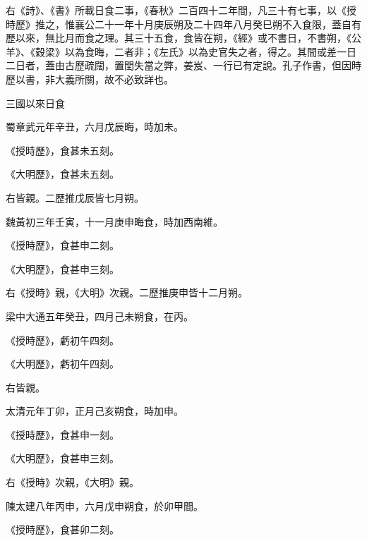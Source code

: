 \begin{pinyinscope}
 右《詩》、《書》所載日食二事，《春秋》二百四十二年間，凡三十有七事，以《授時歷》推之，惟襄公二十一年十月庚辰朔及二十四年八月癸巳朔不入食限，蓋自有歷以來，無比月而食之理。其三十五食，食皆在朔，《經》或不書日，不書朔，《公羊》、《穀梁》以為食晦，二者非；《左氏》以為史官失之者，得之。其間或差一日二日者，蓋由古歷疏闊，置閏失當之弊，姜岌、一行已有定說。孔子作書，但因時歷以書，非大義所關，故不必致詳也。



 三國以來日食



 蜀章武元年辛丑，六月戊辰晦，時加未。



 《授時歷》，食甚未五刻。



 《大明歷》，食甚未五刻。



 右皆親。二歷推戊辰皆七月朔。



 魏黃初三年壬寅，十一月庚申晦食，時加西南維。



 《授時歷》，食甚申二刻。



 《大明歷》，食甚申三刻。



 右《授時》親，《大明》次親。二歷推庚申皆十二月朔。



 梁中大通五年癸丑，四月己未朔食，在丙。



 《授時歷》，虧初午四刻。



 《大明歷》，虧初午四刻。



 右皆親。



 太清元年丁卯，正月己亥朔食，時加申。



 《授時歷》，食甚申一刻。



 《大明歷》，食甚申三刻。



 右《授時》次親，《大明》親。



 陳太建八年丙申，六月戊申朔食，於卯甲間。



 《授時歷》，食甚卯二刻。




\end{pinyinscope}
